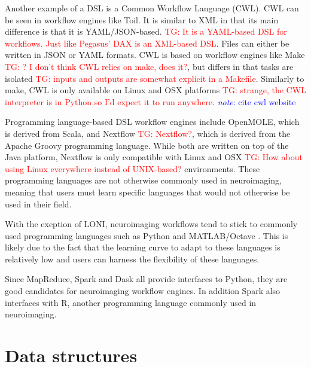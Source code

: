 \documentclass{report}
\newcommand{\note}[1]{\textcolor{blue}{\textit{note}: #1}}
\newcommand{\tristan}[1]{\textcolor{red}{TG: #1}}
\begin{document}
            Another example of a DSL is a Common Workflow
            Language (CWL). CWL can be seen in workflow engines like Toil. 
            It is similar to XML in that its main difference is that it is 
            YAML/JSON-based.
            \tristan{It is a YAML-based DSL for workflows. Just like Pegasus' DAX is an XML-based DSL}. Files can either be written in JSON or YAML formats. CWL is 
            based on workflow engines like Make \tristan{? I don't think CWL relies on make, does it?}, but differs in that tasks
            are isolated \tristan{inputs and outputs are somewhat explicit in a Makefile}. Similarly to 
            make, CWL is only available on Linux and OSX platforms \tristan{strange, the CWL interpreter is in Python so I'd expect it to run anywhere}. \note{cite cwl 
            website}

            Programming language-based DSL workflow engines include OpenMOLE, which is  
            derived from Scala, and Nextflow \tristan{Nextflow?}, which is derived from the Apache 
            Groovy programming language. While both are written on top of the 
            Java platform, Nextflow is only compatible with Linux and OSX \tristan{How about using Linux everywhere instead of UNIX-based?} 
            environments. These programming languages are not otherwise commonly
            used in neuroimaging, meaning that users must learn specific 
            languages that would not otherwise be used in their field.

            With the exeption of LONI, neuroimaging workflows tend to stick to
            commonly used programming languages such as Python and MATLAB/Octave
            . This is likely due to the fact that the learning curve to adapt to
            these languages is relatively low and users can harness the 
            flexibility of these languages. 
            
            Since MapReduce, Spark and Dask all provide interfaces to Python,  
            they are good candidates for neuroimaging workflow engines. In addition
            Spark also interfaces with R, another programming language commonly
            used in neuroimaging.

            \section{Data structures}
                
\end{document}
